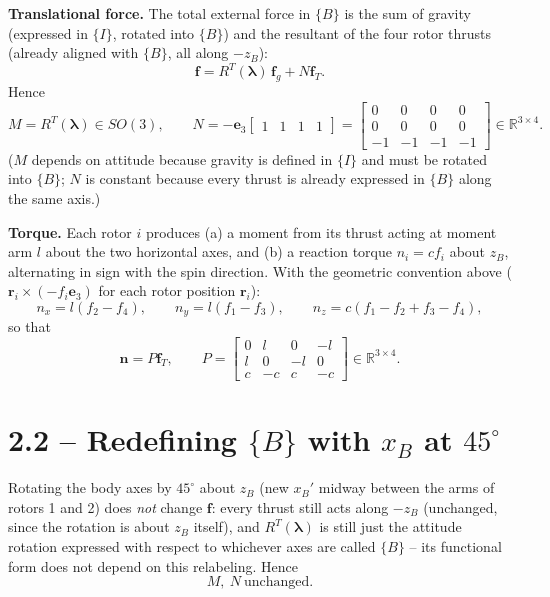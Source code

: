 \documentclass[11pt]{article}
\newcommand{\vect}[1]{\mathbf{#1}}
\begin{document}
\textbf{Translational force.} The total external force in $\{B\}$ is the sum of gravity (expressed in $\{I\}$, rotated into $\{B\}$) and the resultant of the four rotor thrusts (already aligned with $\{B\}$, all along $-z_B$):
\[
\vect{f} = R^T(\vect{\lambda})\,\vect{f}_g + N\vect{f}_T .
\]
Hence
\[
M = R^T(\vect{\lambda}) \in SO(3), \qquad
N = -\vect{e}_3\begin{bmatrix}1&1&1&1\end{bmatrix}
   = \begin{bmatrix} 0&0&0&0\\ 0&0&0&0\\ -1&-1&-1&-1 \end{bmatrix} \in \mathbb{R}^{3\times4}.
\]
($M$ depends on attitude because gravity is defined in $\{I\}$ and must be rotated into $\{B\}$; $N$ is constant because every thrust is already expressed in $\{B\}$ along the same axis.)

\textbf{Torque.} Each rotor $i$ produces (a) a moment from its thrust acting at moment arm $l$ about the two horizontal axes, and (b) a reaction torque $n_i = cf_i$ about $z_B$, alternating in sign with the spin direction. With the geometric convention above ($\vect{r}_i \times (-f_i\vect{e}_3)$ for each rotor position $\vect{r}_i$):
\[
n_x = l(f_2-f_4), \qquad n_y = l(f_1-f_3), \qquad n_z = c(f_1-f_2+f_3-f_4),
\]
so that
\[
\vect{n} = P\vect{f}_T, \qquad
P = \begin{bmatrix} 0 & l & 0 & -l \\ l & 0 & -l & 0 \\ c & -c & c & -c \end{bmatrix} \in \mathbb{R}^{3\times4}.
\]

\section*{2.2 -- Redefining $\{B\}$ with $x_B$ at $45^\circ$}

Rotating the body axes by $45^\circ$ about $z_B$ (new $x_B'$ midway between the arms of rotors 1 and 2) does \emph{not} change $\vect{f}$: every thrust still acts along $-z_B$ (unchanged, since the rotation is about $z_B$ itself), and $R^T(\vect{\lambda})$ is still just the attitude rotation expressed with respect to whichever axes are called $\{B\}$ -- its functional form does not depend on this relabeling. Hence
\[
M,\ N \ \text{unchanged}.
\]
\end{document}
